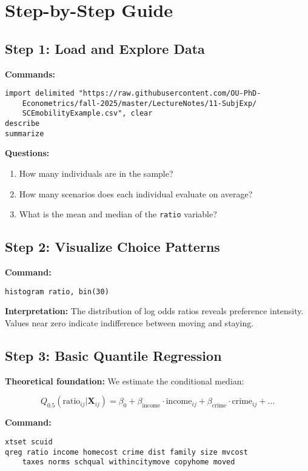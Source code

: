 \documentclass[12pt]{article}
\begin{document}
\section{Step-by-Step Guide}

\subsection{Step 1: Load and Explore Data}

\textbf{Commands:}
\begin{verbatim}
import delimited "https://raw.githubusercontent.com/OU-PhD-
    Econometrics/fall-2025/master/LectureNotes/11-SubjExp/
    SCEmobilityExample.csv", clear
describe
summarize
\end{verbatim}

\textbf{Questions:}
\begin{enumerate}
    \item How many individuals are in the sample?
    \item How many scenarios does each individual evaluate on average?
    \item What is the mean and median of the \texttt{ratio} variable?
\end{enumerate}

\subsection{Step 2: Visualize Choice Patterns}

\textbf{Command:}
\begin{verbatim}
histogram ratio, bin(30)
\end{verbatim}

\textbf{Interpretation:} The distribution of log odds ratios reveals preference intensity. Values near zero indicate indifference between moving and staying.

\subsection{Step 3: Basic Quantile Regression}

\textbf{Theoretical foundation:} We estimate the conditional median:

$$Q_{0.5}(\text{ratio}_{ij} | \mathbf{X}_{ij}) = \beta_0 + \beta_{\text{income}} \cdot \text{income}_{ij} + \beta_{\text{crime}} \cdot \text{crime}_{ij} + \ldots$$

\textbf{Command:}
\begin{verbatim}
xtset scuid
qreg ratio income homecost crime dist family size mvcost 
    taxes norms schqual withincitymove copyhome moved
\end{verbatim}
\end{document}

